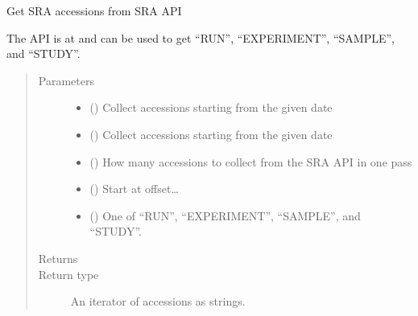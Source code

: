 \documentclass[letterpaper,10pt,english]{sphinxmanual}
\begin{document}
\begin{fulllineitems}
\label{\detokenize{omicidx.sra_parsers:omicidx.sra_parsers.get_accession_list}}
Get SRA accessions from SRA API

The API is at 
and can be used to get “RUN”, “EXPERIMENT”, “SAMPLE”, and “STUDY”.
\begin{quote}\begin{description}
\item[{Parameters}] \leavevmode\begin{itemize}
\item {} 
 () \textendash{} Collect accessions starting from the given date

\item {} 
 () \textendash{} Collect accessions starting from the given date

\item {} 
 () \textendash{} How many accessions to collect from the SRA API in
one pass

\item {} 
 () \textendash{} Start at offset…

\item {} 
 () \textendash{} One of “RUN”, “EXPERIMENT”, “SAMPLE”, and “STUDY”.

\end{itemize}

\item[{Returns}] \leavevmode


\item[{Return type}] \leavevmode
An iterator of accessions as strings.

\end{description}\end{quote}

\end{fulllineitems}
\end{document}
